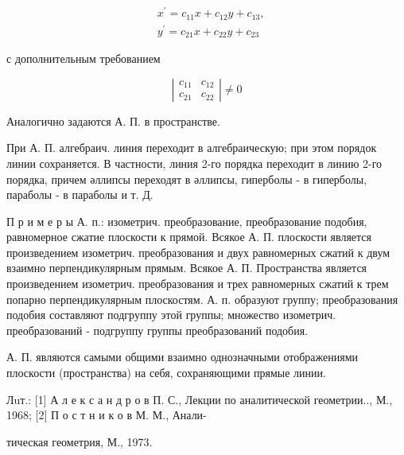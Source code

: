 \documentclass[10pt]{article}
\begin{document}
\[

\begin{aligned}

& x^{\prime}=c_{11} x+c_{12} y+c_{13}, \\

& y^{\prime}=c_{21} x+c_{22} y+c_{23}

\end{aligned}

\]



с дополнительным требованием



\[

\left|\begin{array}{ll}

c_{11} & c_{12} \\

c_{21} & c_{22}

\end{array}\right| \neq 0

\]



Аналогично задаются А. П. в пространстве.



При А. П. алгебраич. линия переходит в алгебраическую; при этом порядок линии сохраняется. В частности, линия 2-го порядка переходит в линию 2-го порядка, причем әллипсы переходят в әллипсы, гиперболы - в гиперболы, параболы - в параболы и т. Д.



П р и м е р ы А. п.: изометрич. преобразование, преобразование подобия, равномерное сжатие плоскости к прямой. Всякое А. П. плоскости является произведением изометрич. преобразования и двух равномерных сжатий к двум взаимно перпендикулярным прямым. Всякое А. П. Пространства является произведением изометрич. преобразования и трех равномерных сжатий к трем попарно перпендикулярным плоскостям. А. п. образуют группу; преобразования подобия составляют подгруппу этой группы; множество изометрич. преобразований - подгруппу группы преобразований подобия.



А. П. являются самыми общими взаимно однозначными отображениями плоскости (пространства) на себя, сохраняющими прямые линии.



Лuт.: [1] А л е к с а н д р о в П. С., Лекции по аналитической геометрии.., М., 1968; [2] П о с т н и к о в М. М., Анали-

тическая геометрия, М., 1973.
\end{document}
